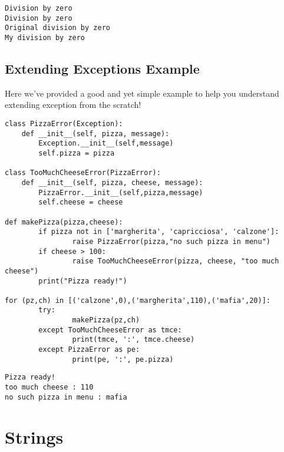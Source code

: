 \documentclass[11pt]{article}
\begin{document}
\begin{verbatim}
Division by zero
Division by zero
Original division by zero
My division by zero
\end{verbatim}

\newpage
\subsection{Extending Exceptions Example}
\label{sec:org73e9d84}
Here we've provided a good and yet simple example to help you
understand extending exception from the scratch!

\begin{verbatim}
class PizzaError(Exception):
    def __init__(self, pizza, message):
        Exception.__init__(self,message)
        self.pizza = pizza

class TooMuchCheeseError(PizzaError):
    def __init__(self, pizza, cheese, message):
        PizzaError.__init__(self,pizza,message)
        self.cheese = cheese

def makePizza(pizza,cheese):
        if pizza not in ['margherita', 'capricciosa', 'calzone']:
                raise PizzaError(pizza,"no such pizza in menu")
        if cheese > 100:
                raise TooMuchCheeseError(pizza, cheese, "too much cheese")
        print("Pizza ready!")

for (pz,ch) in [('calzone',0),('margherita',110),('mafia',20)]:
        try:
                makePizza(pz,ch)
        except TooMuchCheeseError as tmce:
                print(tmce, ':', tmce.cheese)
        except PizzaError as pe:
                print(pe, ':', pe.pizza)
\end{verbatim}

\begin{verbatim}
Pizza ready!
too much cheese : 110
no such pizza in menu : mafia
\end{verbatim}

\newpage

\section{Strings}
\label{sec:org03ac33c}
\end{document}
